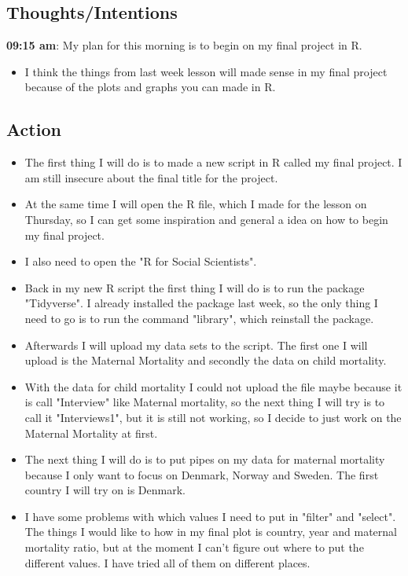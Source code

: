 \documentclass{article}
\begin{document}
\subsection{Thoughts/Intentions}
\textbf{09:15 am}:  My plan for this morning is to begin on my final project in R. 
\begin{itemize}
    \item I think the things from last week lesson will made sense in my final project because of the plots and graphs you can made in R. 
\end{itemize}

\subsection{Action}
\begin{itemize}
    \item The first thing I will do is to made a new script in R called my final project. I am still insecure about the final title for the project. 
    \item At the same time I will open the R file, which I made for the lesson on Thursday, so I can get some inspiration and general a idea on how to begin my final project. 
    \item I also need to open the "R for Social Scientists". 
    \item Back in my new R script the first thing I will do is to run the package "Tidyverse". I already installed the package last week, so the only thing I need to go is to run the command "library", which reinstall the package. 
    \item Afterwards I will upload my data sets to the script. The first one I will upload is the Maternal Mortality and secondly the data on child mortality. 
     \item With the data for child mortality I could not upload the file maybe because it is call "Interview" like Maternal mortality, so the next thing I will try is to call it "Interviews1", but it is still not working, so I decide to just work on the Maternal Mortality at first. 
     \item The next thing I will do is to put pipes on my data for maternal mortality because I only want to focus on Denmark, Norway and Sweden. The first country I will try on is Denmark. 
     \item I have some problems with which values I need to put in "filter" and "select". The things I would like to how in my final plot is country, year and maternal mortality ratio, but at the moment I can't figure out where to put the different values. I have tried all of them on different places. 
\end{itemize}
\end{document}
